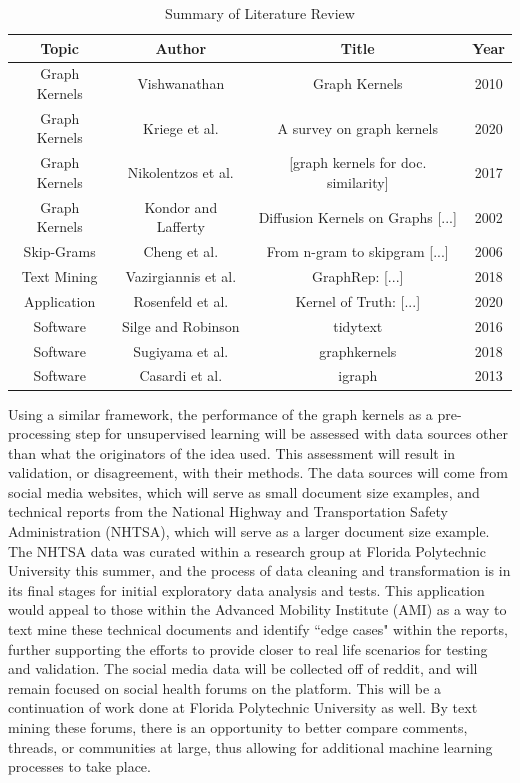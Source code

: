 \documentclass[11pt]{report}
\begin{document}
\begin{table}[H]
\caption{Summary of Literature Review}
\centering
\begin{tabular}{ c c c c}
\hline
\hline
Topic & Author & Title & Year \\ [0.5ex]
\hline
Graph Kernels & Vishwanathan & Graph Kernels & 2010\\
Graph Kernels & Kriege et al. & A survey on graph kernels & 2020\\
Graph Kernels & Nikolentzos et al. & [graph kernels for doc. similarity] & 2017\\
Graph Kernels & Kondor and Lafferty &  Diffusion Kernels on Graphs [...] & 2002\\
Skip-Grams & Cheng et al. & From n-gram to skipgram [...] & 2006\\
Text Mining & Vazirgiannis et al. & GraphRep: [...] & 2018 \\
Application & Rosenfeld et al. & Kernel of Truth: [...] & 2020\\
Software & Silge and Robinson& tidytext &  2016\\
Software & Sugiyama et al. & graphkernels & 2018 \\
Software & Casardi et al. & igraph & 2013\\


\hline
\end{tabular}

\end{table}

Using a similar framework, the performance of the graph kernels as a pre-processing step for unsupervised learning will be assessed with data sources other than what the originators of the idea used. This assessment will result in validation, or disagreement, with their methods. The data sources will come from social media websites, which will serve as small document size examples, and technical reports from the National Highway and Transportation Safety Administration (NHTSA), which will serve as a larger document size example. The NHTSA data was curated within a research group at Florida Polytechnic University this summer, and the process of data cleaning and transformation is in its final stages for initial exploratory data analysis and tests. This application would appeal to those within the Advanced Mobility Institute (AMI) as a way to text mine these technical documents and identify ``edge cases" within the reports, further supporting the efforts to provide closer to real life scenarios for testing and validation. The social media data will be collected off of reddit, and will remain focused on social health forums on the platform. This will be a continuation of work done at Florida Polytechnic University as well. By text mining these forums, there is an opportunity to better compare comments, threads, or communities at large, thus allowing for additional machine learning processes to take place. 
\end{document}
